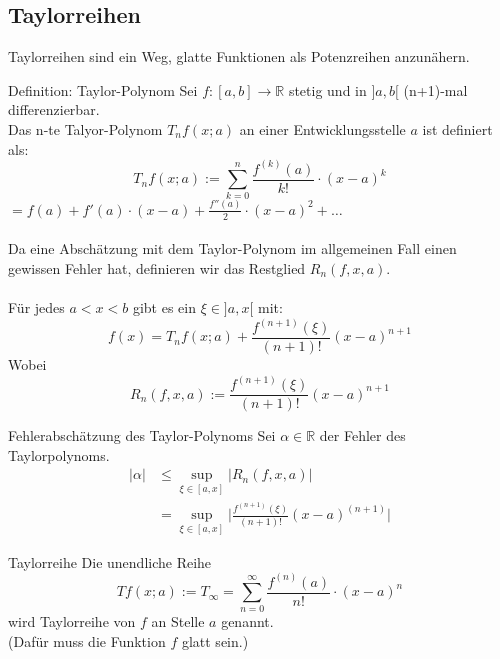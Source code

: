 \documentclass[a4paper,fontsize = 7pt]{scrartcl}
\def\sumn{\sum_{n=0}^\infty}
\def\R{\mathbb{R}}
\begin{document}
\subsection{Taylorreihen}
Taylorreihen sind ein Weg, glatte Funktionen als Potenzreihen anzunähern.

\begin{mainbox}{Definition: Taylor-Polynom}
  \vspace{-4pt}
  Sei $f : [a, b] \to \R$ stetig und in $]a, b[$ (n+1)-mal differenzierbar. 
 \\Das n-te Talyor-Polynom $T_n f(x; a)$ an einer Entwicklungsstelle $a$ ist definiert als:
 $$T_n f(x; a) := \sum_{k=0}^{n} \frac{f^{(k)} (a)}{k!} \cdot (x - a)^k$$ 
 $ = f(a) + f'(a) \cdot (x-a) + \frac{f''(a)}{2} \cdot (x - a)^2 + \ldots$
 \\ \\Da eine Abschätzung mit dem Taylor-Polynom im allgemeinen Fall einen gewissen Fehler hat, definieren wir das Restglied $R_n(f, x, a)$.
 \\ \\
 Für jedes $a < x <b$ gibt es ein $\xi \in ]a, x[$ mit:
 $$f(x) = T_n f(x; a) + \frac{f^{(n+1)}(\xi)}{(n+1)!}(x - a)^{n+1}$$
 Wobei $$R_n(f, x, a) := \frac{f^{(n+1)}(\xi)}{(n+1)!}(x - a)^{n+1}$$
\end{mainbox}

\begin{subbox}{Fehlerabschätzung des Taylor-Polynoms}
  Sei $\alpha \in \R$ der Fehler des Taylorpolynoms.
  \begin{align*}
    |\alpha| &\leq \sup_{\xi \in [a, x]} |R_n(f, x, a)|\\
             &= \sup_{\xi \in [a, x]} \bigg|\frac{f^{(n+1)}(\xi)}{(n+1)!}(x-a)^{(n+1)}\bigg|
  \end{align*}
\end{subbox}

\begin{mainbox}{Taylorreihe}
  \vspace{-4pt}
 Die unendliche Reihe
 $$Tf(x;a) := T_\infty = \sumn \frac{f^{(n)}(a)}{n!} \cdot (x-a)^n$$
 wird Taylorreihe von $f$ an Stelle $a$ genannt.
 \\(Dafür muss die Funktion $f$ glatt sein.)
 \vspace{-4pt}
\end{mainbox}
\end{document}

